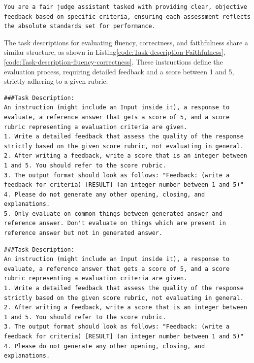 \begin{lstlisting}[style=textstyle, frame = single, caption=Absolute System Prompt \citep{kim2024prometheus2opensource}, label=code:ABS-System-Prompt]
You are a fair judge assistant tasked with providing clear, objective feedback based on specific criteria, ensuring each assessment reflects the absolute standards set for performance.
\end{lstlisting}
The task descriptions for evaluating fluency, correctness, and faithfulness share a similar structure, as shown in Listing\ref{code:Task-description-Faithfulness},\ref{code:Task-description-fluency-correctness}. These instructions define the evaluation process, requiring detailed feedback and a score between 1 and 5, strictly adhering to a given rubric.

\vspace{15pt}

\begin{lstlisting}[style=textstyle, frame = single, caption=Task description used for evaluation of faithfulness \citep{kim2024prometheus2opensource}, label=code:Task-description-Faithfulness]
###Task Description:
An instruction (might include an Input inside it), a response to evaluate, a reference answer that gets a score of 5, and a score rubric representing a evaluation criteria are given.
1. Write a detailed feedback that assess the quality of the response strictly based on the given score rubric, not evaluating in general.
2. After writing a feedback, write a score that is an integer between 1 and 5. You should refer to the score rubric.
3. The output format should look as follows: "Feedback: (write a feedback for criteria) [RESULT] (an integer number between 1 and 5)"
4. Please do not generate any other opening, closing, and explanations.
5. Only evaluate on common things between generated answer and reference answer. Don't evaluate on things which are present in reference answer but not in generated answer.
\end{lstlisting}

\begin{lstlisting}[style=textstyle, frame = single, caption=Task description used for evaluation of fluency and correctness \citep{kim2024prometheus2opensource}, label=code:Task-description-fluency-correctness]
###Task Description:
An instruction (might include an Input inside it), a response to evaluate, a reference answer that gets a score of 5, and a score rubric representing a evaluation criteria are given.
1. Write a detailed feedback that assess the quality of the response strictly based on the given score rubric, not evaluating in general.
2. After writing a feedback, write a score that is an integer between 1 and 5. You should refer to the score rubric.
3. The output format should look as follows: "Feedback: (write a feedback for criteria) [RESULT] (an integer number between 1 and 5)"
4. Please do not generate any other opening, closing, and explanations.
\end{lstlisting}

